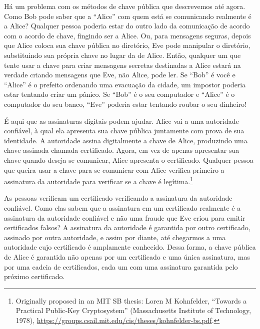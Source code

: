 \documentclass{book}
\begin{document}
Há um problema com os métodos de chave pública que descrevemos até agora. Como Bob pode saber que a ``Alice'' com quem está se comunicando realmente é a Alice? Qualquer pessoa poderia estar do outro lado da comunicação de acordo com o acordo de chave, fingindo ser a Alice. Ou, para mensagens seguras, depois que Alice coloca sua chave pública no diretório, Eve pode manipular o diretório, substituindo sua própria chave no lugar da de Alice. Então, qualquer um que tente usar a chave para criar mensagens secretas destinadas a Alice estará na verdade criando mensagens que Eve, não Alice, pode ler. Se ``Bob'' é você e ``Alice'' é o prefeito ordenando uma evacuação da cidade, um impostor poderia estar tentando criar um pânico. Se ``Bob'' é o seu computador e ``Alice'' é o computador do seu banco, ``Eve'' poderia estar tentando roubar o seu dinheiro!

É aqui que as assinaturas digitais podem ajudar. Alice vai a uma autoridade confiável, à qual ela apresenta sua chave pública juntamente com prova de sua identidade. A autoridade assina digitalmente a chave de Alice, produzindo uma chave assinada chamada certificado. Agora, em vez de apenas apresentar sua chave quando deseja se comunicar, Alice apresenta o certificado. Qualquer pessoa que queira usar a chave para se comunicar com Alice verifica primeiro a assinatura da autoridade para verificar se a chave é legítima.\footnote{Originally proposed in an MIT SB thesis: Loren M Kohnfelder, “Towards a Practical Public‐Key Cryptosystem” (Massachusetts Institute of Technology, 1978), \url{https://groups.csail.mit.edu/cis/theses/kohnfelder‐bs.pdf}.}

As pessoas verificam um certificado verificando a assinatura da autoridade confiável. Como elas sabem que a assinatura em um certificado realmente é a assinatura da autoridade confiável e não uma fraude que Eve criou para emitir certificados falsos? A assinatura da autoridade é garantida por outro certificado, assinado por outra autoridade, e assim por diante, até chegarmos a uma autoridade cujo certificado é amplamente conhecido. Dessa forma, a chave pública de Alice é garantida não apenas por um certificado e uma única assinatura, mas por uma cadeia de certificados, cada um com uma assinatura garantida pelo próximo certificado.
\end{document}
